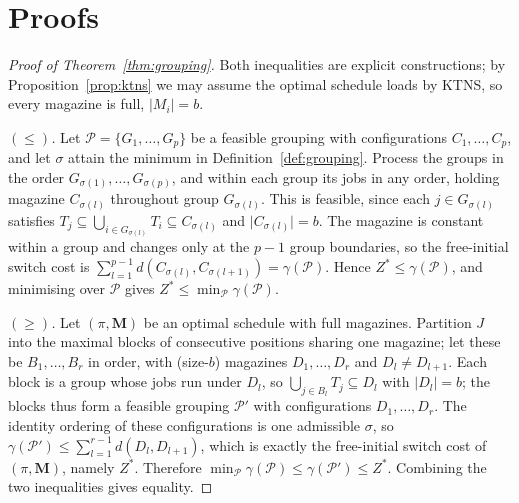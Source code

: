 \documentclass[11pt,a4paper]{article}
\theoremstyle{plain}
\theoremstyle{definition}
\theoremstyle{remark}
\newcommand{\Zst}{Z^{\ast}}
\begin{document}
\appendix
\section{Proofs}\label{app:proofs}
\begin{proof}[Proof of Theorem~\ref{thm:grouping}]
Both inequalities are explicit constructions; by Proposition~\ref{prop:ktns} we may
assume the optimal schedule loads by KTNS, so every magazine is full,
$\lvert M_i\rvert=b$.

\emph{$(\le)$.} Let $\mathcal{P}=\{G_1,\dots,G_p\}$ be a feasible grouping with
configurations $C_1,\dots,C_p$, and let $\sigma$ attain the minimum in
Definition~\ref{def:grouping}. Process the groups in the order $G_{\sigma(1)},\dots,
G_{\sigma(p)}$, and within each group its jobs in any order, holding magazine
$C_{\sigma(l)}$ throughout group $G_{\sigma(l)}$. This is feasible, since each $j\in
G_{\sigma(l)}$ satisfies $T_j\subseteq\bigcup_{i\in G_{\sigma(l)}}T_i\subseteq
C_{\sigma(l)}$ and $\lvert C_{\sigma(l)}\rvert=b$. The magazine is constant within a
group and changes only at the $p-1$ group boundaries, so the free-initial switch
cost is $\sum_{l=1}^{p-1}d(C_{\sigma(l)},C_{\sigma(l+1)})=\gamma(\mathcal{P})$. Hence
$\Zst\le\gamma(\mathcal{P})$, and minimising over $\mathcal{P}$ gives $\Zst\le
\min_{\mathcal{P}}\gamma(\mathcal{P})$.

\emph{$(\ge)$.} Let $(\pi,\mathbf{M})$ be an optimal schedule with full magazines.
Partition $J$ into the maximal blocks of consecutive positions sharing one magazine;
let these be $B_1,\dots,B_r$ in order, with (size-$b$) magazines $D_1,\dots,D_r$ and
$D_l\ne D_{l+1}$. Each block is a group whose jobs run under $D_l$, so
$\bigcup_{j\in B_l}T_j\subseteq D_l$ with $\lvert D_l\rvert=b$; the blocks thus form a
feasible grouping $\mathcal{P}'$ with configurations $D_1,\dots,D_r$. The identity
ordering of these configurations is one admissible $\sigma$, so $\gamma(\mathcal{P}')
\le\sum_{l=1}^{r-1}d(D_l,D_{l+1})$, which is exactly the free-initial switch cost of
$(\pi,\mathbf{M})$, namely $\Zst$. Therefore $\min_{\mathcal{P}}\gamma(\mathcal{P})
\le\gamma(\mathcal{P}')\le\Zst$. Combining the two inequalities gives equality.
\end{proof}
\end{document}
